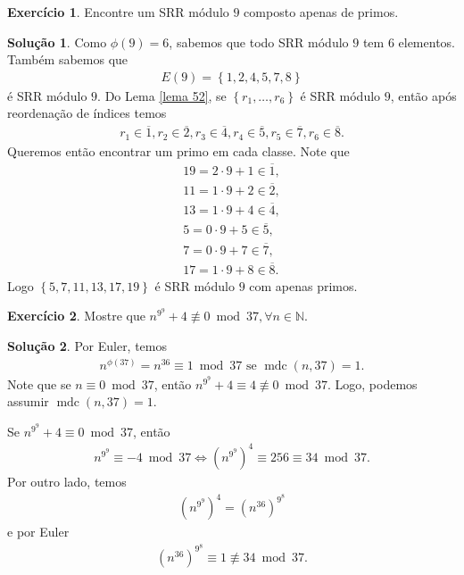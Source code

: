 \documentclass[a4paper,11pt,twoside, leqno]{article}
\DeclareMathOperator{\mdc}{mdc}
\theoremstyle{definition}
\newtheorem{exercise}{Exercício}
\newtheorem*{solution}{Solução}
\begin{document}
\begin{exercise}
	Encontre um SRR módulo $9$ composto apenas de primos.
\end{exercise}
\begin{solution}
	Como $\phi(9) = 6$, sabemos que todo SRR módulo $9$ tem $6$ elementos. Também sabemos que
	\begin{align*}
	E(9) = \left\{ 1,2,4,5,7,8 \right\}
	\end{align*}
	é SRR módulo $9$. Do Lema \eqref{lema 52}, se $\left\{ r_1,\dots,r_6 \right\}$ é SRR módulo $9$, então após reordenação de índices temos
	\begin{align*}
	r_1\in\overline{1}, r_2\in\overline{2}, r_3\in\overline{4}, r_4\in\overline{5}, r_5\in\overline{7}, r_6\in\overline{8}.
	\end{align*}
	Queremos então encontrar um primo em cada classe. Note que
	\begin{align*}
	19 = 2\cdot 9 + 1 \in\overline{1}, \\
	11 = 1\cdot 9 + 2 \in\overline{2}, \\
	13 = 1\cdot 9 + 4 \in\overline{4}, \\
	5 = 0\cdot 9 + 5 \in\overline{5}, \\
	7 = 0\cdot 9 + 7 \in\overline{7}, \\
	17 = 1\cdot 9 + 8 \in\overline{8}.
	\end{align*}
	Logo $\left\{ 5,7,11,13,17,19 \right\}$ é SRR módulo $9$ com apenas primos.
\end{solution}

\begin{exercise}
	Mostre que $n^{9^9} + 4\not\equiv 0\bmod 37, \forall n\in\mathbb{N}$.
\end{exercise}
\begin{solution}
	Por Euler, temos
	\begin{align*}
	n^{\phi(37)}  = n^{36} \equiv 1 \bmod 37\text{ se } \mdc(n,37) = 1.
	\end{align*}
	Note que se $n\equiv 0\bmod 37$, então $n^{9^9}+4\equiv 4\not\equiv 0\bmod 37$. Logo, podemos assumir $\mdc(n,37) = 1$.
	\par\vspace{0.3cm} Se $n^{9^9} + 4\equiv 0\bmod 37$, então
	\begin{align*}
	n^{9^9}\equiv -4\bmod 37 \Leftrightarrow \left( n^{9^9} \right)^4 \equiv 256\equiv 34\bmod 37.
	\end{align*} 
	Por outro lado, temos 
	\begin{align*}
	\left( n^{9^9} \right)^4 = \left( n^{36} \right)^{9^8}
	\end{align*}
	e por Euler
	\begin{align*}
	\left( n^{36} \right)^{9^8} \equiv 1\not\equiv 34\bmod 37.
	\end{align*}
\end{solution}
\end{document}
